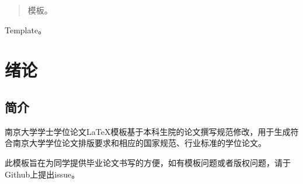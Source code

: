 \documentclass[
    TitleLength=1,%
]{njuthesis}
\begin{document}
\maketitle

\begin{abstract}
    模板。
\end{abstract}

\begin{englishabstract}
    Template。
\end{englishabstract}

\tableofcontents

\mainmatter

\chapter{绪论}
\section{简介}
南京大学学士学位论文\LaTeX 模板\cite{njuthesis}基于本科生院的论文撰写规范修改，用于生成符合南京大学学位论文排版要求和相应的国家规范、行业标准的学位论文。

此模板旨在为同学提供毕业论文书写的方便，如有模板问题或者版权问题，请于Github上提出issue。
\end{document}
